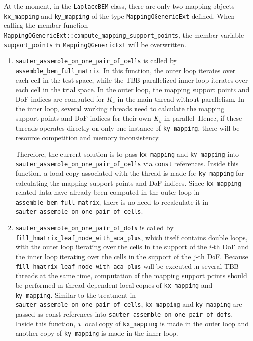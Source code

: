 \documentclass[11pt, a4paper]{book}
\begin{document}
At the moment, in the \texttt{LaplaceBEM} class, there are only two mapping objects \texttt{kx\_mapping} and \texttt{ky\_mapping} of the type \texttt{MappingQGenericExt} defined. When calling the member function \texttt{MappingQGenericExt::compute\_mapping\_support\_points}, the member variable \texttt{support\_points} in \texttt{MappingQGenericExt} will be overwritten.

\begin{enumerate}
\item \texttt{sauter\_assemble\_on\_one\_pair\_of\_cells} is called by \texttt{assemble\_bem\_full\_matrix}. In this function, the outer loop iterates over each cell in the test space, while the TBB parallelized inner loop iterates over each cell in the trial space. In the outer loop, the mapping support points and DoF indices are computed for \(K_x\) in the main thread without parallelism. In the inner loop, several working threads need to calculate the mapping support points and DoF indices for their own \(K_y\) in parallel. Hence, if these threads operates directly on only one instance of \texttt{ky\_mapping}, there will be resource competition and memory inconsistency.

Therefore, the current solution is to pass \texttt{kx\_mapping} and \texttt{ky\_mapping} into \texttt{sauter\_assemble\_on\_one\_pair\_of\_cells} via \texttt{const} references. Inside this function, a local copy associated with the thread is made for \texttt{ky\_mapping} for calculating the mapping support points and DoF indices. Since \texttt{kx\_mapping} related data have already been computed in the outer loop in \texttt{assemble\_bem\_full\_matrix}, there is no need to recalculate it in \texttt{sauter\_assemble\_on\_one\_pair\_of\_cells}.

\item \texttt{sauter\_assemble\_on\_one\_pair\_of\_dofs} is called by \texttt{fill\_hmatrix\_leaf\_node\_with\_aca\_plus}, which itself contains double loops, with the outer loop iterating over the cells in the support of the \(i\)-th DoF and the inner loop iterating over the cells in the support of the \(j\)-th DoF. Because \texttt{fill\_hmatrix\_leaf\_node\_with\_aca\_plus} will be executed in several TBB threads at the same time, computation of the mapping support points should be performed in thread dependent local copies of \texttt{kx\_mapping} and \texttt{ky\_mapping}. Similar to the treatment in \texttt{sauter\_assemble\_on\_one\_pair\_of\_cells}, \texttt{kx\_mapping} and \texttt{ky\_mapping} are passed as const references into \texttt{sauter\_assemble\_on\_one\_pair\_of\_dofs}. Inside this function, a local copy of \texttt{kx\_mapping} is made in the outer loop and another copy of \texttt{ky\_mapping} is made in the inner loop.
\end{enumerate}
\end{document}
